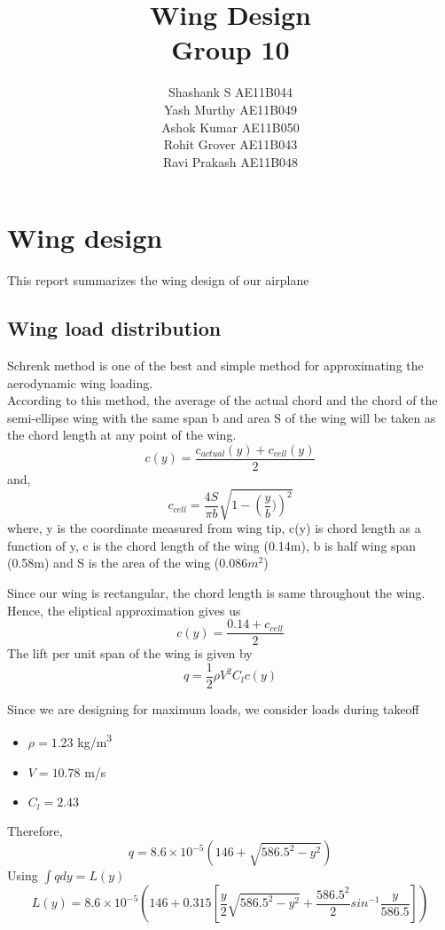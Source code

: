 \documentclass[a4paper,10pt]{report}
\title{Wing Design\\Group 10}
\author{Shashank S AE11B044\\Yash Murthy AE11B049\\Ashok Kumar AE11B050\\Rohit Grover AE11B043\\Ravi Prakash AE11B048}
\date{}
\begin{document}
\maketitle
\chapter{Wing design}
This report summarizes the wing design of our airplane

\section{Wing load distribution}
Schrenk method is one of the best and simple method for approximating the aerodynamic wing 
loading.
\\
According to this method, the average of the actual chord and the chord of the semi-ellipse wing 
with the same span b and area S of the wing will be taken as the chord length at any point of the 
wing.
\begin{equation} c(y) = \frac{c_{actual}(y) + c_{cell}(y)}{2} \end{equation}
and,  \[ c_{cell} = \frac{4S}{\pi b}\sqrt{1 - \left(\frac{y}{b})\right)^2} \]
where, y is the coordinate measured from wing tip, c(y) is chord length as a function of y, c is the chord length of the wing (0.14m), b is half wing span (0.58m) and S is the area of the wing (0.086$m^2$)

Since our wing is rectangular, the chord length is same throughout the wing. Hence, the eliptical approximation gives us
\begin{equation} c(y) = \frac{0.14 + c_{cell}}{2} \end{equation}
The lift per unit span of the wing is given by
\begin{equation} q = \frac{1}{2}\rho V^2C_lc(y) \end{equation}


Since we are designing for maximum loads, we consider loads during takeoff
\begin{itemize}
\item $\rho = 1.23$ kg/m\textsuperscript{3}
\item $V = 10.78$  m/s
\item $C_l = 2.43$
\end{itemize}
Therefore,
\begin{equation} q = 8.6\times10^{-5}(146 + \sqrt{586.5^2 - y^2}) \end{equation}
Using $\int{qdy} = L(y)$
\begin{equation}
L(y) = 8.6\times10^{-5}\left(146 + 0.315\left[\frac{y}{2}\sqrt{586.5^2 - y^2} + \frac{586.5^2}{2}sin^{-1}\frac{y}{586.5}\right]\right)
\end{equation}
\end{document}

